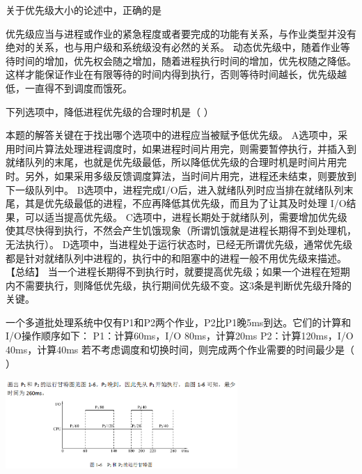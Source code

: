 \question 关于优先级大小的论述中，正确的是
\par{}
\begin{solution}优先级应当与进程或作业的紧急程度或者要完成的功能有关系，与作业类型并没有绝对的关系，也与用户级和系统级没有必然的关系。
动态优先级中，随着作业等待时间的增加，优先权会随之增加，随着进程执行时间的增加，优先权随之降低。这样才能保证作业在有限等待的时间内得到执行，否则等待时间越长，优先级越低，一直得不到调度而饿死。
\end{solution}
\question 下列选项中，降低进程优先级的合理时机是（ ）
\par{}
\begin{solution}本题的解答关键在于找出哪个选项中的进程应当被赋予低优先级。
A选项中，采用时间片算法处理进程调度时，如果进程时间片用完，则需要暂停执行，并插入到就绪队列的末尾，也就是优先级最低，所以降低优先级的合理时机是时间片用完时。另外，如果采用多级反馈调度算法，当时间片用完，进程还未结束，则要放到下一级队列中。
B选项中，进程完成I/O后，进入就绪队列时应当排在就绪队列末尾，其是优先级最低的进程，不应再降低其优先级，而且为了让其及时处理
I/O结果，可以适当提高优先级。
C选项中，进程长期处于就绪队列，需要增加优先级使其尽快得到执行，不然会产生饥饿现象（所谓饥饿就是进程长期得不到处理机，无法执行）。
D选项中，当进程处于运行状态时，已经无所谓优先级，通常优先级都是针对就绪队列中进程的，执行中的和阻塞中的进程一般不用优先级来描述。
【总结】
当一个进程长期得不到执行时，就要提高优先级；如果一个进程在短期内不需要执行，则降低优先级，执行期间优先级不变。这3条是判断优先级升降的关键。
\end{solution}
\question 一个多道批处理系统中仅有P1和P2两个作业，P2比P1晚5ms到达。它们的计算和I/O操作顺序如下：
P1：计算60ms，I/O 80ms，计算20ms P2：计算120ms，I/O 40ms，计算40ms
若不考虑调度和切换时间，则完成两个作业需要的时间最少是（ ）
\par{}
\begin{solution}\includegraphics[width=3.46875in,height=1.32292in]{computerassets/9B057B841FA35D592A38935D909C62F2.png}
\end{solution}
